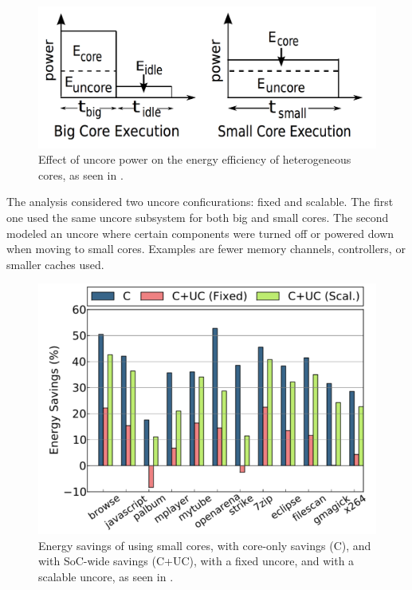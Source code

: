 \begin{figure}[htb]
    \centering
    \includegraphics[width=1.0\textwidth]{Figures/Heterogeneous/Uncore1}
    \caption{Effect of uncore power on the energy efficiency of heterogeneous cores, as seen in \cite{heterogeneous-uncore}.}
    \label{fig:Uncore1}
\end{figure}



The analysis considered two uncore conficurations: fixed and scalable.
The first one used the same uncore subsystem for both big and small cores.
The second modeled an uncore where certain components were turned off or powered down when moving to small cores.
Examples are fewer memory channels, controllers, or smaller caches used.  

\begin{figure}[htb]
    \centering
    \includegraphics[width=1.0\textwidth]{Figures/Heterogeneous/Uncore2}
    \caption{Energy savings of using small cores, with core-only savings (C), and with SoC-wide savings (C+UC), with a fixed uncore, and with a scalable uncore, as seen in \cite{heterogeneous-uncore}.}
    \label{fig:Uncore2}
\end{figure}

